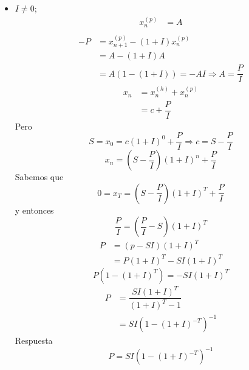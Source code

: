 \begin{ejercicio}
\begin{itemize}
        \item $I \neq 0$;
        \begin{align*}
            x_n^{(p)} &= A \\
        \end{align*}
        \begin{align*}
            -P &= x_{n+1}^{(p)} - (1+I)x_n^{(p)} \\
                      &= A-(1+I)A \\
                      &= A (1-(1+I)) = -AI \Longrightarrow A = \dfrac{P}{I}
        \end{align*}
        \begin{align*}
            x_n &= x_n^{(h)} + x_n^{(p)} \\
                &= c + \dfrac{P}{I}
        \end{align*}
        Pero
        \begin{equation*}
            S = x_0 = c{(1+I)}^0 + \dfrac{P}{I} \Longrightarrow c = S - \dfrac{P}{I}
        \end{equation*}
        \begin{equation*}
            x_n = \left(S - \dfrac{P}{I}\right){(1+I)}^n + \dfrac{P}{I}
        \end{equation*}
        Sabemos que
        \begin{equation*}
            0 = x_T = \left(S-\dfrac{P}{I}\right){(1+I)}^T + \dfrac{P}{I}
        \end{equation*}
        y entonces
        \begin{equation*}
            \dfrac{P}{I} = \left(\dfrac{P}{I} - S\right){(1+I)}^T
        \end{equation*}
        \begin{align*}
            P &= (p-SI){(1+I)}^T \\
              &= P{{(1+I)}}^T - SI{{(1+I)}}^T
        \end{align*}
        \begin{equation*}
            P(1-{(1+I)}^T) = -SI{(1+I)}^T
        \end{equation*}
        \begin{align*}
            P &= \dfrac{SI{(1+I)}^T}{{(1+I)}^T-1} \\
              &= SI{(1-{(1+I)}^{-T})}^{-1}
        \end{align*}
        Respuesta
        \begin{equation*}
              P = SI{(1-{(1+I)}^{-T})}^{-1}
        \end{equation*}
    \end{itemize}

\end{ejercicio}
